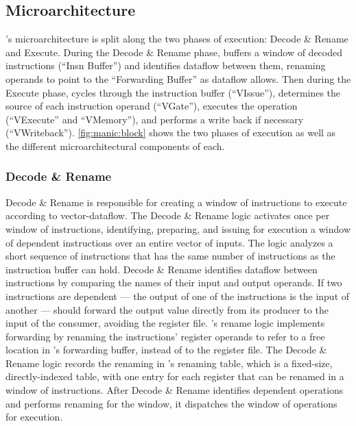 \subsection{Microarchitecture}
\label{manic:manic:uarch}
\manic's microarchitecture is split along the two phases of execution: Decode \& Rename and Execute.
% 
During the Decode \& Rename phase, \manic buffers a window of decoded instructions (``Insn Buffer'') and identifies dataflow between them, renaming operands to point to the ``Forwarding Buffer'' as dataflow allows.
% 
Then during the Execute phase, \manic cycles through the instruction buffer (``VIssue''), determines the source of each instruction operand (``VGate''), executes the operation (``VExecute'' and ``VMemory''), and performs a write back if necessary (``VWriteback'').
%
\autoref{fig:manic:block} shows the two phases of execution as well as the different microarchitectural components of each.

\figMANICBlock

\subsubsection{Decode \& Rename}
Decode \& Rename is responsible for creating a window of
instructions to execute according to vector-dataflow.
%
The Decode \& Rename logic activates once per window of instructions, identifying,
preparing, and issuing for execution a window of dependent instructions over an entire vector of inputs.
%
%
The logic analyzes a short sequence of instructions that has the same
number of instructions as the instruction buffer can hold. 
%
Decode \& Rename identifies dataflow between instructions by comparing the names
of their input and output operands. 
%
If two instructions are dependent --- the output of one of the instructions is 
the input of another ---  \manic should forward the output value directly from
its producer to the input of the consumer, avoiding the register file.
\manic's rename logic implements forwarding by renaming the instructions' register operands 
to refer to a free location in \manic's forwarding
buffer, instead of to the register file. 
%
The Decode \& Rename logic records the renaming in \manic's renaming table, which is a
fixed-size, directly-indexed table, with one entry for each register that can
be renamed in a window of instructions.
%
After Decode \& Rename identifies dependent operations and performs renaming for the window, it dispatches the window of operations for execution.


